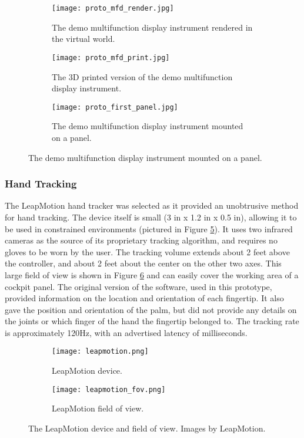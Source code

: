 \begin{figure}
    \centering
    \begin{subfigure}[t]{0.32\linewidth}
        \centering
        \texttt{[image: proto\_mfd\_render.jpg]}
        \caption{The demo multifunction display instrument rendered in the virtual world.}
        \label{fig:proto_mfd_render}
    \end{subfigure}
    \begin{subfigure}[t]{0.32\linewidth}
        \centering
        \texttt{[image: proto\_mfd\_print.jpg]}
        \caption{The 3D printed version of the demo multifunction display instrument.}
        \label{fig:proto_mfd_print}
    \end{subfigure}
    \begin{subfigure}[t]{0.32\linewidth}
        \centering
        \texttt{[image: proto\_first\_panel.jpg]}
        \caption{The demo multifunction display instrument mounted on a panel.}
        \label{fig:proto_first_panel}
    \end{subfigure}
\end{figure}


\subsubsection{Hand Tracking}

The LeapMotion hand tracker was selected as it provided an unobtrusive method for hand tracking.
The device itself is small (3 in x 1.2 in x 0.5 in), allowing it to be used in constrained environments (pictured in Figure \ref{fig:proto_leap_device}).
It uses two infrared cameras as the source of its proprietary tracking algorithm, and requires no gloves to be worn by the user.
The tracking volume extends about 2 feet above the controller, and about 2 feet about the center on the other two axes.
This large field of view is shown in Figure \ref{fig:proto_leap_fov} and can easily cover the working area of a cockpit panel.
The original version of the software, used in this prototype, provided information on the location and orientation of each fingertip.
It also gave the position and orientation of the palm, but did not provide any details on the joints or which finger of the hand the fingertip belonged to.
The tracking rate is approximately 120Hz, with an advertised latency of milliseconds.

\begin{figure}
    \centering
    \begin{subfigure}[t]{0.49\linewidth}
        \centering
        \texttt{[image: leapmotion.png]}
        \caption{LeapMotion device.}
        \label{fig:proto_leap_device}
    \end{subfigure}
    \begin{subfigure}[t]{0.49\linewidth}
        \centering
        \texttt{[image: leapmotion\_fov.png]}
        \caption{LeapMotion field of view.}
        \label{fig:proto_leap_fov}
    \end{subfigure}
    \caption{The LeapMotion device and field of view. Images by LeapMotion.}
    \label{fig:proto_leap}
\end{figure}

